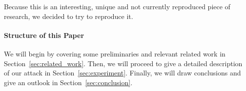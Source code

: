 Because this is an interesting, unique and not currently reproduced piece of research, we decided to try to reproduce it.

\paragraph{Structure of this Paper}%
\label{par:structure_of_this_paper}
We will begin by covering some preliminaries and relevant related work in Section~\ref{sec:related_work}.
Then, we will proceed to give a detailed description of our attack in Section~\ref{sec:experiment}.
Finally, we will draw conclusions and give an outlook in Section~\ref{sec:conclusion}.

